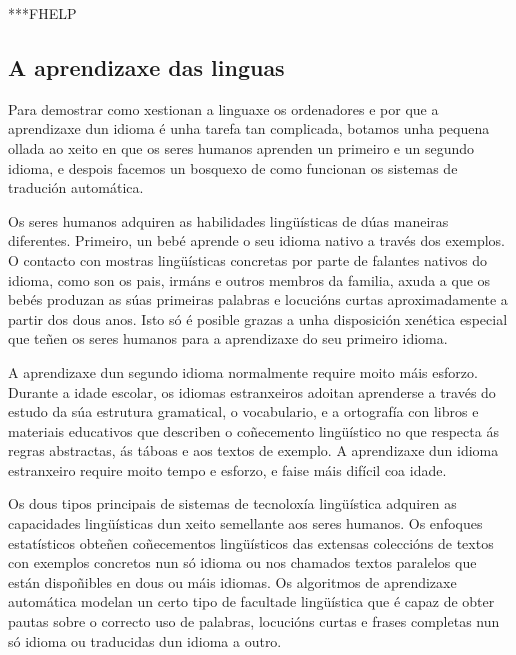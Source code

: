 \begin{multicols}{2}
***FHELP

\subsection{A aprendizaxe das linguas}

   Para demostrar como xestionan a linguaxe os ordenadores e por que a aprendizaxe dun idioma é unha tarefa tan complicada, botamos unha pequena ollada ao xeito en que os seres humanos aprenden un primeiro e un segundo idioma, e despois facemos un bosquexo de como funcionan os sistemas de tradución automática.

Os seres humanos adquiren as habilidades lingüísticas de dúas maneiras diferentes. Primeiro, un bebé aprende o seu idioma nativo a través dos exemplos. O contacto con mostras lingüísticas concretas por parte de falantes nativos do idioma, como son os pais, irmáns e outros membros da familia, axuda a que os bebés produzan as súas primeiras palabras e locucións curtas aproximadamente a partir dos dous anos. Isto só é posible grazas a unha disposición xenética especial que teñen os seres humanos para a aprendizaxe do seu primeiro idioma. 

A aprendizaxe dun segundo idioma normalmente require moito máis esforzo. Durante a idade escolar, os idiomas estranxeiros adoitan aprenderse a través do estudo da súa estrutura gramatical, o vocabulario, e a ortografía con libros e materiais educativos que describen o coñecemento lingüístico no que respecta ás regras abstractas, ás táboas e aos textos de exemplo. A aprendizaxe dun idioma estranxeiro require moito tempo e esforzo, e faise máis difícil coa idade.


Os dous tipos principais de sistemas de tecnoloxía lingüística adquiren as capacidades lingüísticas dun xeito semellante aos seres humanos. Os enfoques estatísticos obteñen coñecementos lingüísticos das extensas coleccións de textos con exemplos concretos nun só idioma ou nos chamados textos paralelos que están dispoñibles en dous ou máis idiomas. Os algoritmos de aprendizaxe automática modelan un certo tipo de facultade lingüística que é capaz de obter pautas sobre o correcto uso de palabras, locucións curtas e frases completas nun só idioma ou traducidas dun idioma a outro. 


\end{multicols}
